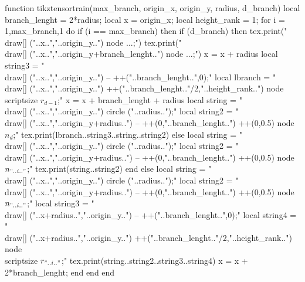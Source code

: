 \begin{luacode*}
  
    function tikztensortrain(max_branch, origin_x, origin_y, radius, d_branch)
      local branch_lenght = 2*radius;
      local x = origin_x;
      local height_rank = 1;
      for i = 1,max_branch,1 do
        if (i == max_branch) then
          if (d_branch) then
            tex.print("\\draw[] ("..x..","..origin_y..") node {...};")
            tex.print("\\draw[] ("..x..","..origin_y+branch_lenght..") node {...};")
            x = x + radius
            local string3 = "\\draw[] ("..x..","..origin_y..") -- ++("..branch_lenght..",0);"
            local lbranch = "\\draw[] ("..x..","..origin_y..") ++("..branch_lenght.."/2,"..height_rank..") node {\\scriptsize $r_{d-1}$};"
            x = x + branch_lenght + radius
            local string = "\\draw[] ("..x..","..origin_y..") circle ("..radius..");"
            local string2 = "\\draw[] ("..x..","..origin_y+radius..") -- ++(0,"..branch_lenght..") ++(0,0.5) node {$n_{d}$};"
            tex.print(lbranch..string3..string..string2)
          else
            local string = "\\draw[] ("..x..","..origin_y..") circle ("..radius..");"
            local string2 = "\\draw[] ("..x..","..origin_y+radius..") -- ++(0,"..branch_lenght..") ++(0,0.5) node {$n_{"..i.."}$};"
            tex.print(string..string2)
          end
        else
          local string = "\\draw[] ("..x..","..origin_y..") circle ("..radius..");"
          local string2 = "\\draw[] ("..x..","..origin_y+radius..") -- ++(0,"..branch_lenght..") ++(0,0.5) node {$n_{"..i.."}$};"
          local string3 = "\\draw[] ("..x+radius..","..origin_y..") -- ++("..branch_lenght..",0);"
          local string4 = "\\draw[] ("..x+radius..","..origin_y..") ++("..branch_lenght.."/2,"..height_rank..") node {\\scriptsize $r_{"..i.."}$};"
          tex.print(string..string2..string3..string4)
          x = x + 2*branch_lenght;
        end
      end
    end


\end{luacode*}
